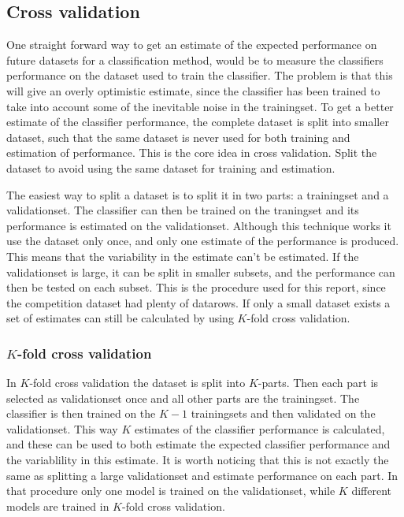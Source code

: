 \subsection{Cross validation}
One straight forward way to get an estimate of the expected performance on future datasets for a classification method, would be to measure the classifiers performance on the dataset used to train the classifier. The problem is that this will give an overly optimistic estimate, since the classifier has been trained to take into account some of the inevitable noise in the trainingset. To get a better estimate of the classifier performance, the complete dataset is split into smaller dataset, such that the same dataset is never used for both training and estimation of performance. This is the core idea in cross validation. Split the dataset to avoid using the same dataset for training and estimation. \par
The easiest way to split a dataset is to split it in two parts: a trainingset and a validationset. The classifier can then be trained on the traningset and its performance is estimated on the validationset. Although this technique works it use the dataset only once, and only one estimate of the performance is produced. This means that the variability in the estimate can't be estimated. If the validationset is large, it can be split in smaller subsets, and the performance can then be tested on each subset. This is the procedure used for this report, since the competition dataset had plenty of datarows. If only a small dataset exists a set of estimates can still be calculated by using $K$-fold cross validation. 

\subsubsection{$K$-fold cross validation}
In $K$-fold cross validation the dataset is split into $K$-parts. Then each part is selected as validationset once and all other parts are the trainingset. The classifier is then trained on the $K-1$ trainingsets and then validated on the validationset. This way $K$ estimates of the classifier performance is calculated, and these can be used to both estimate the expected classifier performance and the variablility in this estimate. It is worth noticing that this is not exactly the same as splitting a large validationset and estimate performance on each part. In that procedure only one model is trained on the validationset, while $K$ different models are trained in $K$-fold cross validation.

